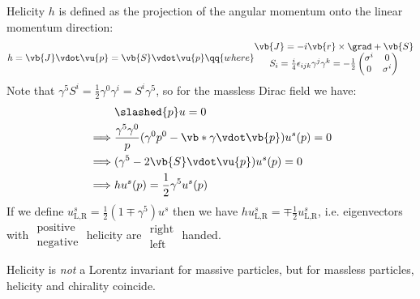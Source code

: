 \documentclass{jknotes}
\begin{document}
Helicity \(h\) is defined as the projection of the angular momentum onto the linear momentum direction:
\begin{equation}
    h = \vb{J}\vdot\vu{p} = \vb{S}\vdot\vu{p} \qq{where}
    \begin{matrix}
        \vb{J} = -i\vb{r}\times\grad+\vb{S} \\
        S_i = \frac{i}{4}\epsilon_{ijk}\gamma^j\gamma^k = - \frac{1}{2}
        \begin{pmatrix}
            \sigma^i & 0 \\
            0 & \sigma^i
        \end{pmatrix}
    \end{matrix}
\end{equation}
Note that \(\gamma^5S^i = \frac{1}{2}\gamma^0\gamma^i = S^i\gamma^5\), so for the massless Dirac field we have:
\begin{align}
    &\slashed{p} u = 0 \\
    \implies& \frac{\gamma^5\gamma^0}{p}(\gamma^0p^0-\vb*{\gamma}\vdot\vb{p})u^s(p) = 0 \\
    \implies& (\gamma^5 - 2\vb{S}\vdot\vu{p})u^s(p) = 0 \\
    \implies& hu^s(p) = \frac{1}{2}\gamma^5u^s(p)
\end{align}
If we define \(u^s_{\text{L,R}} = \frac{1}{2}(1\mp\gamma^5)u^s\) then we have \(hu^s_{\text{L,R}} = \mp\frac{1}{2}u^s_{\text{L,R}}\), i.e. eigenvectors with \(
\begin{matrix}
    \text{positive} \\ \text{negative}
\end{matrix}
\) helicity are \(
\begin{matrix}
    \text{right} \\ \text{left}
\end{matrix}
\) handed.

Helicity is \emph{not} a Lorentz invariant for massive particles, but for massless particles, helicity and chirality coincide.
\end{document}
